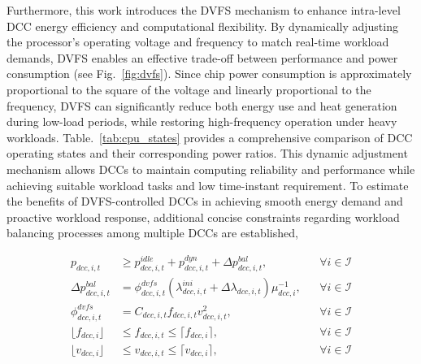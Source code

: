 \documentclass[lettersize,journal]{IEEEtran}
\begin{document}
Furthermore, this work introduces the DVFS mechanism to enhance intra-level DCC energy efficiency and computational flexibility.
By dynamically adjusting the processor's operating voltage and frequency to match real-time workload demands, DVFS enables an effective trade-off
between performance and power consumption (see Fig.~\ref{fig:dvfs}). Since chip power consumption is approximately proportional to the square of the
voltage and linearly proportional to the frequency, DVFS can significantly reduce both energy use and heat generation during low-load periods, while
restoring high-frequency operation under heavy workloads. Table.~\ref{tab:cpu_states} provides a comprehensive comparison of DCC operating states and their corresponding power ratios.
This dynamic adjustment mechanism allows DCCs to maintain computing reliability and performance while achieving suitable workload tasks and low time-instant requirement.
To estimate the benefits of DVFS-controlled DCCs in achieving smooth energy demand and proactive workload response, additional concise constraints regarding workload balancing processes among multiple DCCs are established,


\vspace{-0.25cm}
\begin{subequations}
	\begin{align}
		\!\!\!\!p_{dcc,i,t}                 & \geq p_{dcc,i,t}^{idle} \!+\! p_{dcc,i,t}^{dyn} + \varDelta p_{dcc,i,t}^{bal},                                         &  & \forall i\in\mathcal{I}  \\
		\!\!\!\!\varDelta p_{dcc,i,t}^{bal} & = \phi_{dcc,i,t}^{dvfs} {\left ( \lambda_{dcc,i,t}^{ini} \!+\! \varDelta \lambda_{dcc,i,t}\right )}{\mu_{dcc,i}^{-1}}, &  & \forall i\in \mathcal{I} \\
		\!\!\!\!\phi_{dcc,i,t}^{dvfs}       & = C_{dcc,i,t} f_{dcc,i,t} v_{dcc,i,t}^{2},                                                                             &  & \forall i\in \mathcal{I} \\
		\!\!\!\!\lfloor f_{dcc,i} \rfloor   & \leq f_{dcc,i,t} \leq \lceil f_{dcc,i} \rceil,                                                                         &  & \forall i\in \mathcal{I} \\
		\!\!\!\!\lfloor v_{dcc,i} \rfloor   & \leq v_{dcc,i,t} \leq \lceil v_{dcc,i} \rceil,                                                                         &  & \forall i\in \mathcal{I}
	\end{align}
\end{subequations}
\end{document}
